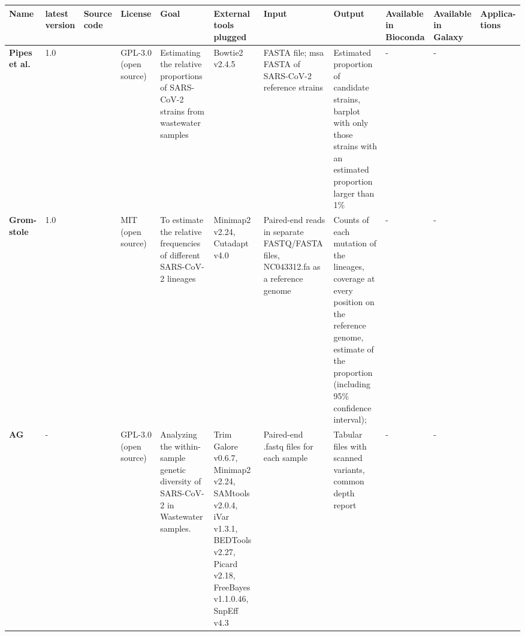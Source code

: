 \begin{landscape}
\begin{table}[ht!]
                \tiny
                \begin{tabular}{l|l|l|l|l|l|l|l|l|l|l}
\multicolumn{1}{m{1cm}|}{\textbf{Name}}&\multicolumn{1}{m{0.7cm}|}{\textbf{latest version}}&\multicolumn{1}{m{0.7cm}|}{\textbf{Source code}}&\multicolumn{1}{m{0.75cm}|}{\textbf{License}}&\multicolumn{1}{m{3cm}|}{\textbf{Goal}}&\multicolumn{1}{m{3cm}|}{\textbf{External tools plugged}}&\multicolumn{1}{m{3cm}|}{\textbf{Input}}&\multicolumn{1}{m{3cm}|}{\textbf{Output}}&\multicolumn{1}{m{1cm}|}{\textbf{Available in Bioconda}}&\multicolumn{1}{m{1cm}|}{\textbf{Available in Galaxy}}&\multicolumn{1}{m{1cm}}{\textbf{Applica- tions}}\\ \hline 
\multicolumn{1}{m{1cm}|}{\textbf{Pipes et al.}}&\multicolumn{1}{m{0.7cm}|}{1.0}&\multicolumn{1}{m{0.7cm}|}{\cite{pipes2022}}&\multicolumn{1}{m{0.75cm}|}{GPL-3.0 (open source)}&\multicolumn{1}{m{3cm}|}{Estimating the relative proportions of SARS-CoV-2 strains from wastewater samples}&\multicolumn{1}{m{3cm}|}{Bowtie2 v2.4.5}&\multicolumn{1}{m{3cm}|}{FASTA file; \acrshort{msa} FASTA of SARS-CoV-2 reference strains}&\multicolumn{1}{m{3cm}|}{Estimated proportion of candidate strains, barplot with only those strains with an estimated proportion larger than 1\%}&\multicolumn{1}{m{1cm}|}{-}&\multicolumn{1}{m{1cm}|}{-}&\multicolumn{1}{m{1cm}}{\cite{pipes2022}}\\ \hline 
\multicolumn{1}{m{1cm}|}{\textbf{Grom- stole}}&\multicolumn{1}{m{0.7cm}|}{1.0}&\multicolumn{1}{m{0.7cm}|}{\cite{gromstole2022}}&\multicolumn{1}{m{0.75cm}|}{MIT (open source)}&\multicolumn{1}{m{3cm}|}{To estimate the relative frequencies of different SARS-CoV-2 lineages}&\multicolumn{1}{m{3cm}|}{Minimap2 v2.24, Cutadapt v4.0}&\multicolumn{1}{m{3cm}|}{Paired-end reads in separate FASTQ/FASTA files, NC043312.fa as a reference genome}&\multicolumn{1}{m{3cm}|}{Counts of each mutation of the lineages, coverage at every position on the reference genome, estimate of the proportion (including 95\% confidence interval); }&\multicolumn{1}{m{1cm}|}{-}&\multicolumn{1}{m{1cm}|}{-}&\multicolumn{1}{m{1cm}}{\cite{gromstole2022}}\\ \hline 
\multicolumn{1}{m{1cm}|}{\textbf{AG}}&\multicolumn{1}{m{0.7cm}|}{-}&\multicolumn{1}{m{0.7cm}|}{\cite{nguessan2022}}&\multicolumn{1}{m{0.75cm}|}{GPL-3.0 (open source)}&\multicolumn{1}{m{3cm}|}{Analyzing the within-sample genetic diversity of SARS-CoV-2 in Wastewater samples.}&\multicolumn{1}{m{3cm}|}{Trim Galore v0.6.7, Minimap2 v2.24, SAMtools v2.0.4, iVar v1.3.1, BEDTools v2.27, Picard v2.18, FreeBayes v1.1.0.46, SnpEff v4.3}&\multicolumn{1}{m{3cm}|}{Paired-end .fastq files for each sample}&\multicolumn{1}{m{3cm}|}{Tabular files with scanned variants, common depth report}&\multicolumn{1}{m{1cm}|}{-}&\multicolumn{1}{m{1cm}|}{-}&\multicolumn{1}{m{1cm}}{\cite{nguessan2022}}\\ \hline 

\end{tabular}
\end{table}
\end{landscape}
